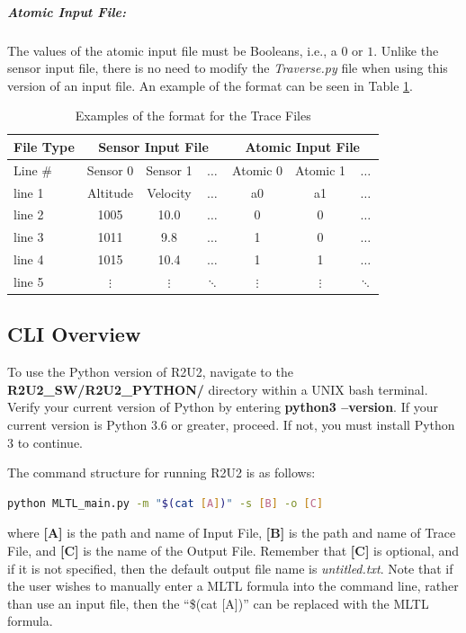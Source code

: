 \subparagraph{Atomic Input File:}
\label{AtomicInputFile}
The values of the atomic input file must be Booleans, i.e., a $0$ or $1$. Unlike the sensor input file, there is no need to modify the \textit{Traverse.py} file when using this version of an input file. An example of the format can be seen in Table \ref{SensorTable}.

\begin{table}[H]
	\caption{Examples of the format for the Trace Files}
	\label{SensorTable}
	\begin{center}
	\begin{tabular}{l | ccc | ccc}
		\hline
		\hline
		\textbf{File Type} & \multicolumn{3}{c|}{\textbf{Sensor Input File}} & \multicolumn{3}{c}{\textbf{Atomic Input File}}\\
		\hline
		Line \# & Sensor 0 & Sensor 1 & $\dots$ & Atomic 0 & Atomic 1 & $\dots$\\
		\hline
		line 1 & Altitude & Velocity & $\dots$ & a0 & a1 & $\dots$\\
		line 2 & 1005 & 10.0 & $\dots$ & 0 & 0 & $\dots$\\
		line 3 & 1011 &  9.8 & $\dots$ & 1 & 0 & $\dots$\\
		line 4 & 1015 & 10.4 & $\dots$ & 1 & 1 & $\dots$\\
		line 5 & $\vdots$ & $\vdots$ & $\ddots$ & $\vdots$ & $\vdots$ & $\ddots$\\
		\hline
		\hline
	\end{tabular}
	\end{center}
\end{table}

\subsection{CLI Overview}
To use the Python version of R2U2, navigate to the \textbf{R2U2\_SW/R2U2\_PYTHON/} directory within a UNIX bash terminal. Verify your current version of Python by entering \textbf{python3 --version}. If your current version is Python 3.6 or greater, proceed. If not, you must install Python 3 to continue.

The command structure for running R2U2 is as follows:
\begin{lstlisting}[language=Bash]
	python MLTL_main.py -m "$(cat [A])" -s [B] -o [C]
\end{lstlisting}
where \textbf{[A]} is the path and name of Input File, \textbf{[B]} is the path and name of Trace File, and \textbf{[C]} is the name of the Output File. Remember that \textbf{[C]} is optional, and if it is not specified, then the default output file name is \textit{untitled.txt}. Note that if the user wishes to manually enter a MLTL formula into the command line, rather than use an input file, then the ``\$(cat [A])'' can be replaced with the MLTL formula.

\clearpage
